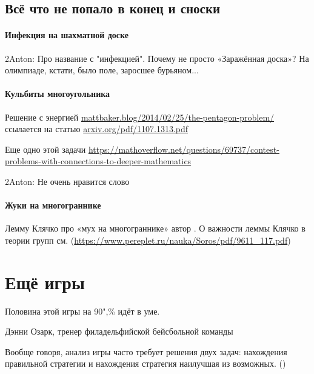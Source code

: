 \documentclass[twoside]{book}
\begin{document}
\section*{Всё что не попало в конец и сноски}
 
\subsubsection{Инфекция на шахматной доске}
2Anton: Про название с "инфекцией".
Почему не просто «Заражённая доска»? 
На олимпиаде, кстати, было поле, заросшее бурьяном... 

\subsubsection{Кульбиты многоугольника}
Решение с энергией \url{mattbaker.blog/2014/02/25/the-pentagon-problem/} ссылается на статью \url{arxiv.org/pdf/1107.1313.pdf} 

Еще одно  этой задачи 
\url{https://mathoverflow.net/questions/69737/contest-problems-with-connections-to-deeper-mathematics}

2Anton: Не очень нравится слово 

\subsubsection{Жуки на многограннике}
Лемму Клячко про «мух на многограннике» автор .
О важности леммы Клячко в теории групп см. 
(\url{https://www.pereplet.ru/nauka/Soros/pdf/9611_117.pdf})



\chapter{Ещё игры}

\setlength{\epigraphwidth}{.5\textwidth}
\epigraph{Половина этой игры на 90",\% идёт в уме.\vspace{1ex}}{Дэнни Озарк, тренер филадельфийской бейсбольной команды}

Вообще говоря, анализ игры часто требует решения двух задач: нахождения правильной стратегии и нахождения  стратегия наилучшая из возможных.
()
\end{document}
